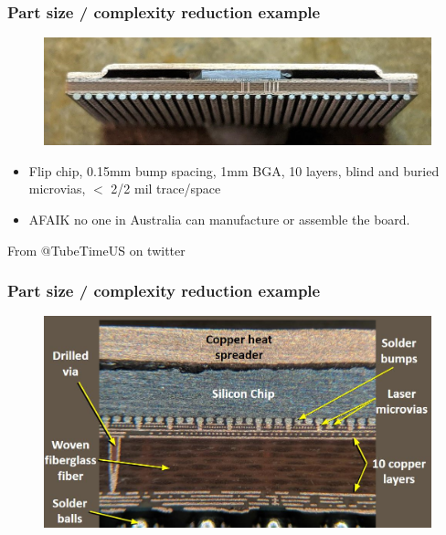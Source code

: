 \documentclass[t]{beamer}
\begin{document}
\begin{frame}[t]
\frametitle{Part size / complexity reduction example}
\begin{figure}
	\includegraphics[width=\linewidth]{bga1.jpg}
\end{figure}
\begin{itemize}
	\item  Flip chip, 0.15mm bump spacing, 1mm BGA, 10 layers, blind and buried microvias, $<$ 2/2 mil trace/space \\
	\item AFAIK no one in Australia can manufacture or assemble the board.
\end{itemize}
From @TubeTimeUS on twitter
\end{frame}

\begin{frame}[t]
\frametitle{Part size / complexity reduction example}
\begin{figure}
	\includegraphics[width=0.9\linewidth]{bga3.jpg}
\end{figure}
\end{frame}
\end{document}
